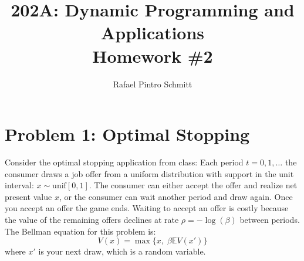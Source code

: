 \documentclass[11pt]{extarticle}
\title{202A: Dynamic Programming and Applications\\[5pt] {\Large \textbf{Homework \#2}}}
\author{Rafael Pintro Schmitt}
\date{}
\theoremstyle{plain}
\theoremstyle{definition}
\begin{document}
\maketitle





\vspace{5mm}
\section*{Problem 1: Optimal Stopping}

Consider the optimal stopping application from class: Each period $t = 0, 1, \ldots$ the consumer draws a job offer from a uniform distribution with support in the unit interval: $x \sim \text{unif}[0, 1]$. The consumer can either accept the offer and realize net present value $x$, or the consumer can wait another period and draw again. Once you accept an offer the game ends. Waiting to accept an offer is costly because the value of the remaining offers declines at rate $\rho = - \log(\beta)$ between periods. The Bellman equation for this problem is:
\begin{equation*}
	V(x) = \max \bigg\{ x, \; \beta \mathbb E V(x') \bigg\}
\end{equation*}
where $x'$ is your next draw, which is a random variable.
\end{document}
